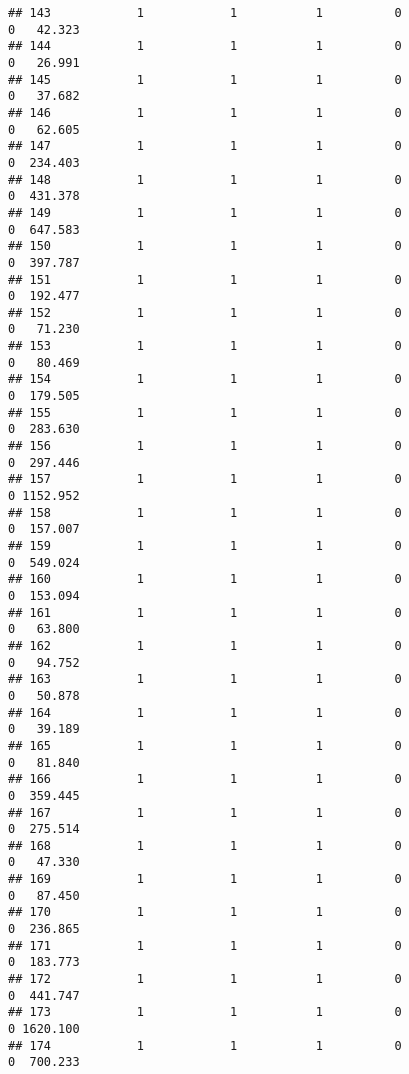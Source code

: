 \documentclass[
]{article}
\begin{document}
\begin{verbatim}
## 143            1            1           1          0                0   42.323
## 144            1            1           1          0                0   26.991
## 145            1            1           1          0                0   37.682
## 146            1            1           1          0                0   62.605
## 147            1            1           1          0                0  234.403
## 148            1            1           1          0                0  431.378
## 149            1            1           1          0                0  647.583
## 150            1            1           1          0                0  397.787
## 151            1            1           1          0                0  192.477
## 152            1            1           1          0                0   71.230
## 153            1            1           1          0                0   80.469
## 154            1            1           1          0                0  179.505
## 155            1            1           1          0                0  283.630
## 156            1            1           1          0                0  297.446
## 157            1            1           1          0                0 1152.952
## 158            1            1           1          0                0  157.007
## 159            1            1           1          0                0  549.024
## 160            1            1           1          0                0  153.094
## 161            1            1           1          0                0   63.800
## 162            1            1           1          0                0   94.752
## 163            1            1           1          0                0   50.878
## 164            1            1           1          0                0   39.189
## 165            1            1           1          0                0   81.840
## 166            1            1           1          0                0  359.445
## 167            1            1           1          0                0  275.514
## 168            1            1           1          0                0   47.330
## 169            1            1           1          0                0   87.450
## 170            1            1           1          0                0  236.865
## 171            1            1           1          0                0  183.773
## 172            1            1           1          0                0  441.747
## 173            1            1           1          0                0 1620.100
## 174            1            1           1          0                0  700.233

\end{verbatim}
\end{document}
